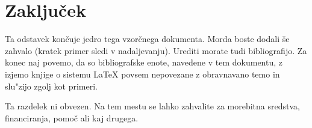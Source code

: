 \documentclass[sigconf,nonacm]{acmart}
\begin{document}
\section{Zaključek}

Ta odstavek končuje jedro tega vzorčnega dokumenta.  Morda boste dodali še
zahvalo (kratek primer sledi v nadaljevanju).  Urediti morate tudi
bibliografijo.  Za konec naj povemo, da so bibliografske enote, navedene v tem
dokumentu, z izjemo knjige o sistemu \LaTeX{} povsem nepovezane z obravnavano
temo in slu"zijo zgolj kot primeri.

\begin{acks}
    Ta razdelek ni obvezen.  Na tem mestu se lahko zahvalite za morebitna
    sredstva, financiranja, pomoč ali kaj drugega.
\end{acks}



\end{document}
